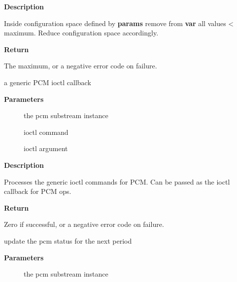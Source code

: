 \documentclass[a4paper,8pt,english]{sphinxmanual}
\begin{document}
\textbf{Description}

Inside configuration space defined by \textbf{params} remove from \textbf{var} all
values \textless{} maximum. Reduce configuration space accordingly.

\textbf{Return}

The maximum, or a negative error code on failure.

\begin{fulllineitems}
\label{sound/kernel-api/alsa-driver-api:c.snd_pcm_lib_ioctl}
a generic PCM ioctl callback

\end{fulllineitems}


\textbf{Parameters}
\begin{description}
\item[{}] \leavevmode
the pcm substream instance

\item[{}] \leavevmode
ioctl command

\item[{}] \leavevmode
ioctl argument

\end{description}

\textbf{Description}

Processes the generic ioctl commands for PCM.
Can be passed as the ioctl callback for PCM ops.

\textbf{Return}

Zero if successful, or a negative error code on failure.

\begin{fulllineitems}
\label{sound/kernel-api/alsa-driver-api:c.snd_pcm_period_elapsed}
update the pcm status for the next period

\end{fulllineitems}


\textbf{Parameters}
\begin{description}
\item[{}] \leavevmode
the pcm substream instance

\end{description}
\end{document}
